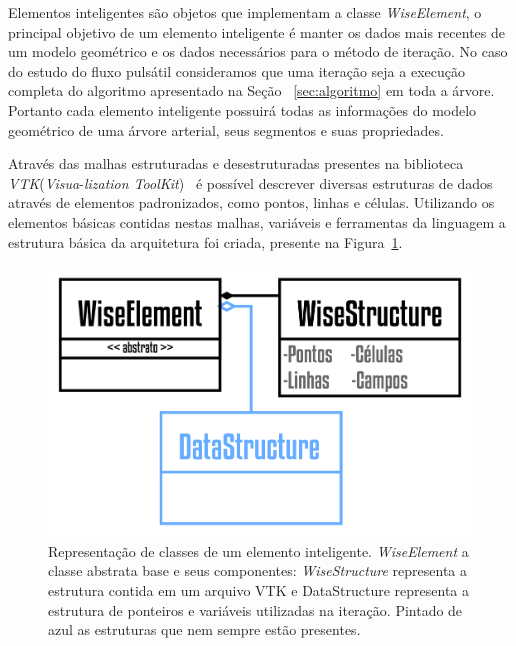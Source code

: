 Elementos inteligentes são objetos que implementam a classe \textit{WiseElement}, o principal objetivo de um elemento inteligente é manter os dados mais recentes de um modelo geométrico e os dados necessários para o método de iteração. No caso do estudo do fluxo pulsátil consideramos que uma iteração seja a execução completa do algoritmo apresentado na Seção~ \ref{sec:algoritmo} em toda a árvore. Portanto cada elemento inteligente possuirá todas as informações do modelo geométrico de uma árvore arterial, seus segmentos e suas propriedades.

Através das malhas estruturadas e desestruturadas presentes na biblioteca \textit{VTK}(\textit{Visua}-\textit{lization ToolKit})~\cite{VTKUSER} é possível descrever diversas estruturas de dados através de elementos padronizados, como pontos, linhas e células. Utilizando os elementos básicas contidas nestas malhas, variáveis e ferramentas da linguagem a estrutura básica da arquitetura foi criada, presente na Figura~\ref{fig2:wiselement}.

\begin{figure}[!htbp]
	\centering
	\includegraphics[scale=2]{Figures/WiseElement@16x.png}
	\caption{Representação de classes de um elemento inteligente. \textit{WiseElement} a classe abstrata base e seus componentes: \textit{WiseStructure} representa a estrutura contida em um arquivo VTK e DataStructure representa a estrutura de ponteiros e variáveis utilizadas na iteração. Pintado de azul as estruturas que nem sempre estão presentes.}
	\label{fig2:wiselement}
\end{figure}


